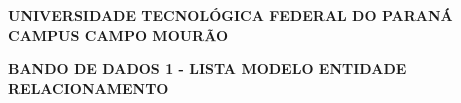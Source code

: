 \documentclass[a4paper, 12pt]{article}
\begin{document}
	
	\hspace{5cm}
	
	\begin{large}
		\begin{center}
			\textbf{UNIVERSIDADE TECNOLÓGICA FEDERAL DO PARANÁ}\newline
			\textbf{CAMPUS CAMPO MOURÃO}
		\end{center}
	\end{large}
	
	\vspace{0.5cm}
	
	\begin{center}
		\textbf{BANDO DE DADOS 1 - LISTA MODELO ENTIDADE RELACIONAMENTO}
	\end{center}

	\vspace{0.5cm}
	

	
	
\end{document}
